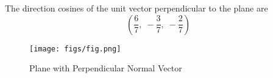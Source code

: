 \documentclass[journal]{IEEEtran}
\begin{document}
The direction cosines of the unit vector perpendicular to the plane are 
\[
    \left(
        \frac{6}{7},\;
        -\frac{3}{7},\;
        -\frac{2}{7}
    \right)
\]

\begin{figure}
    \centering
    \texttt{[image: figs/fig.png]}
    \caption{Plane with Perpendicular Normal Vector}
    \label{fig:placeholder}
\end{figure}
\end{document}
